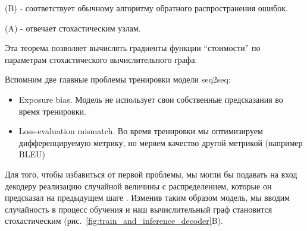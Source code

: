 \documentclass[14pt, a4paper]{extarticle}
\newcommand{\cX}{\mathcal{X}}
\newcommand{\inp}{\theta}
\newcommand{\outp}{c}
\newcommand{\anc}[1]{\textsc{deps}_{#1}}
\renewcommand{\cX}{\Theta}
\newcommand{\dbyd}[1]{\frac{\partial}{\partial #1}}
\newcommand{\E}{\mathbb{E}}
\newcommand{\Ea}[1]{\E\left[#1\right]}
\newcommand{\precd}{\prec^{\scriptscriptstyle D}}
\newcommand{\cC}{\mathcal{C}}
\newcommand{\cS}{\mathcal{S}}
\DeclarePairedDelimiter{\lrparen}{(}{)}
\begin{document}
(B) - соответствует обычному алгоритму обратного распространения ошибок.

(A) - отвечает стохастическим узлам.

Эта теорема позволяет вычислять градиенты функции ``стоимости'' по параметрам стохастического вычислительного графа.

Вспомним две главные проблемы тренировки модели seq2seq:
\begin{itemize}
  \item Exposure bias. Модель не использует свои собственные предсказания во время тренировки.
  \item Loss-evaluation mismatch. Во время тренировки мы оптимизируем дифференцируемую метрику, но
  меряем качество другой метрикой (например BLEU)
\end{itemize}

Для того, чтобы избавиться от первой проблемы, мы могли бы подавать на вход декодеру реализацию случайной величины с распределением,
 которые он предсказал на предыдущем шаге \cite{scg_seq2seq}. Изменив таким образом модель, мы вводим случайность в процесс обучения и наш вычислительный
граф становится стохастическим (рис.~\ref{fig:train_and_inference_decoder}B).
\end{document}
